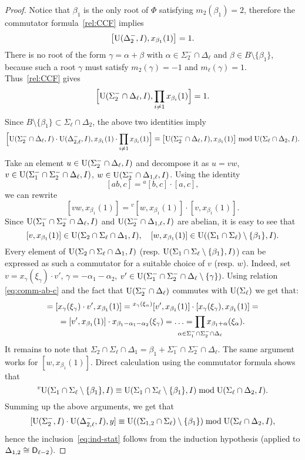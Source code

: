 \begin{proof}
Notice that $\beta_1$ is the only root of $\Phi$ satisfying $m_2(\beta_1)=2$, therefore the commutator formula~\eqref{rel:CCF} implies
\[ \bigl[\operatorname{U}(\Delta_2^-, I),x_{\beta_1}(1)\bigr]=1. \]
There is no root of the form $\gamma=\alpha+\beta$ with $\alpha\in\Sigma_2^-\cap\Delta_\ell$ and $\beta\in B\setminus\{\beta_1\}$, because such a root $\gamma$ must satisfy $m_2(\gamma)=-1$ and $m_\ell(\gamma)=1$. Thus~\eqref{rel:CCF} gives
\[\Bigl[\operatorname{U}(\Sigma_2^-\cap\Delta_\ell, I),\prod_{i\neq1}x_{\beta_i}(1)\Bigr]=1. \]
Since $B\setminus\{\beta_1\}\subset\Sigma_\ell\cap\Delta_2$, the above two identities imply
\[ \Bigl[ \operatorname{U}(\Sigma_2^-\cap\Delta_\ell, I)\cdot\operatorname{U}(\Delta_{2,\ell}^-, I), x_{\beta_1}(1)\cdot\prod_{i\neq1}x_{\beta_i}(1) \Bigr] \equiv \bigl[ \operatorname{U}(\Sigma_2^-\cap\Delta_\ell, I), x_{\beta_1}(1) \bigr] \bmod \operatorname{U}(\Sigma_\ell\cap\Delta_2, I). \]
Take an element $u\in\operatorname{U}(\Sigma_2^-\cap\Delta_\ell, I)$ and decompose it as $u=vw$, $v\in\operatorname{U}(\Sigma_1^-\cap\Sigma_2^-\cap\Delta_\ell, I)$, $w\in\operatorname{U}(\Sigma_2^-\cap\Delta_{1,\ell}, I)$.
Using the identity
\begin{equation}\label{eq:comm-ab-c}
[ab,c]={}^a[b,c]\cdot[a,c],
\end{equation}
we can rewrite
\[ [vw,x_{\beta_1}(1)] = {}^v[w,x_{\beta_1}(1)]\cdot[v,x_{\beta_1}(1)].  \]
Since $\operatorname{U}(\Sigma_1^-\cap\Sigma_2^-\cap\Delta_\ell, I)$ and $\operatorname{U}(\Sigma_2^-\cap\Delta_{1,\ell}, I)$ are abelian, it is easy to see that
\[ [v,x_{\beta_1}(1)]\in\operatorname{U}(\Sigma_2\cap\Sigma_\ell\cap\Delta_1, I), \quad [w,x_{\beta_1}(1)]\in\operatorname{U}((\Sigma_1\cap\Sigma_\ell)\setminus\{\beta_1\}, I). \]
Every element of $\operatorname{U}(\Sigma_2\cap\Sigma_\ell\cap\Delta_1, I)$ (resp. $\operatorname{U}(\Sigma_1\cap\Sigma_\ell\setminus\{\beta_1\}, I)$) can be expressed as such a commutator for a suitable choice of $v$ (resp. $w$).
Indeed, set $v=x_\gamma(\xi_\gamma)\cdot v'$, $\gamma=-\alpha_1-\alpha_2$, $v' \in \operatorname{U}(\Sigma_1^- \cap \Sigma_2^- \cap \Delta_\ell \setminus \{\gamma\})$.
Using relation \eqref{eq:comm-ab-c} and the fact that $\operatorname{U}(\Sigma_2^-\cap\Delta_\ell)$ commutes with $\operatorname{U}(\Sigma_\ell)$ we get that:
\begin{multline*}
[v, x_{\beta_1}(1)] = [x_\gamma(\xi_\gamma)\cdot v', x_{\beta_1}(1)] = {}^{x_\gamma(\xi_\alpha)}[v', x_{\beta_1}(1)] \cdot [x_\gamma(\xi_\gamma), x_{\beta_1}(1)] = \\
= [v', x_{\beta_1}(1)]\cdot x_{\beta_1-\alpha_1-\alpha_2}(\xi_\gamma) = \ldots = \prod_{\mathclap{\alpha\in\Sigma_1^- \cap \Sigma_2^- \cap \Delta_\ell}} x_{\beta_1+\alpha}(\xi_\alpha).
 \end{multline*}
It remains to note that $\Sigma_2 \cap \Sigma_\ell \cap \Delta_1 = \beta_1 + \Sigma_1^- \cap \Sigma_2^- \cap \Delta_\ell$. The same argument works for $[w, x_{\beta_1}(1)]$.
Direct calculation using the commutator formula shows that
\[ {}^v\!\operatorname{U}(\Sigma_1\cap\Sigma_\ell\setminus\{\beta_1\}, I) \equiv \operatorname{U}(\Sigma_1\cap\Sigma_\ell\setminus\{\beta_1\}, I) \bmod \operatorname{U}(\Sigma_\ell\cap\Delta_2, I). \]
Summing up the above arguments, we get that
\[ [\operatorname{U}(\Sigma_2^-, I)\cdot\operatorname{U}(\Delta_{2,\ell}^-, I),y] \equiv \operatorname{U}((\Sigma_{1,2}\cap\Sigma_\ell)\setminus\{\beta_1\}) \bmod \operatorname{U}(\Sigma_\ell\cap\Delta_2, I), \]
hence the inclusion~\eqref{eq:ind-stat} follows from the induction hypothesis (applied to $\Delta_{1,2} \cong \mathsf{D}_{\ell-2}$). 


\end{proof}
